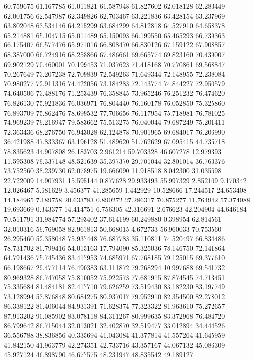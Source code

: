 60.759675
61.167785
61.011821
61.587948
61.827602
62.018128
62.283449
62.001756
62.547987
62.349826
62.703467
63.221836
63.428154
63.237969
63.802048
63.534146
64.215299
63.684299
64.812818
64.527910
64.658378
65.214881
65.104715
65.011489
65.150093
66.199550
65.465293
66.739363
66.175407
66.577476
65.971016
66.808470
66.830126
67.159122
67.908857
68.387000
66.724916
68.258866
67.486661
69.665774
69.823160
70.439007
69.902129
70.460001
70.199453
71.037623
71.418168
70.770861
69.568847
70.267649
73.207238
72.709839
72.549263
71.649344
72.148955
72.238084
70.980277
72.911316
74.422056
73.184283
72.143774
74.844227
72.950579
74.640506
73.488176
71.253439
76.358845
73.965246
76.251232
76.474620
76.826130
75.921836
76.036971
76.804440
76.160178
76.052850
75.325860
76.893709
75.862476
78.699532
77.706656
76.117954
75.718981
76.781025
74.969239
79.216947
79.583662
75.513275
76.040044
79.687249
75.201411
72.363436
68.276750
76.943028
62.124878
70.901965
69.684017
76.206990
36.421988
47.833367
63.196128
51.489620
51.762629
67.095415
44.735718
78.835623
44.907808
26.183703
2.961214
59.703328
46.607278
12.979393
11.595308
79.337148
48.521639
35.397370
29.701044
32.801014
36.763376
73.752560
38.239730
62.078975
19.666090
11.918518
8.042300
31.035698
22.722009
14.907931
15.595144
0.877628
29.933493
55.997329
2.852109
9.170342
12.026467
5.681629
3.456377
41.285659
1.442929
10.528666
17.244517
24.653408
14.184965
7.189758
20.633783
0.890272
27.286317
70.875277
11.764942
57.374088
19.693669
0.343377
14.414751
6.756305
42.316691
2.676623
42.204904
44.646184
70.511791
31.984774
57.293402
37.614199
60.249880
0.398954
62.814561
32.010316
59.769058
82.961813
50.668015
4.672733
56.960033
70.753560
26.295460
52.358048
75.937448
76.687783
35.110811
74.520497
66.834486
78.731702
80.799416
54.015163
17.794090
85.325036
78.146750
72.141864
64.791436
75.745436
83.417953
74.685971
67.768185
79.125015
69.377610
66.198667
29.477114
76.490383
63.111872
79.268294
10.997688
69.541732
80.969328
86.747058
75.810052
75.922573
77.681915
87.874545
74.713451
75.335684
81.484181
82.417710
79.626259
73.519430
83.182230
83.197749
73.128994
53.876848
80.684275
80.937017
79.952910
82.354500
82.278012
86.338122
80.406044
84.931391
71.628374
77.323322
81.963610
75.272657
87.913202
90.085902
83.078118
84.311267
80.999635
83.372968
76.484720
86.799642
86.715044
32.013021
32.402870
32.519477
33.012894
34.444526
36.556788
38.836856
40.335694
41.043084
41.377814
41.557264
41.645959
41.842150
41.963779
42.274351
42.733716
43.357167
44.067132
45.086309
45.927124
46.898790
46.677575
48.231947
48.835542
49.189127
